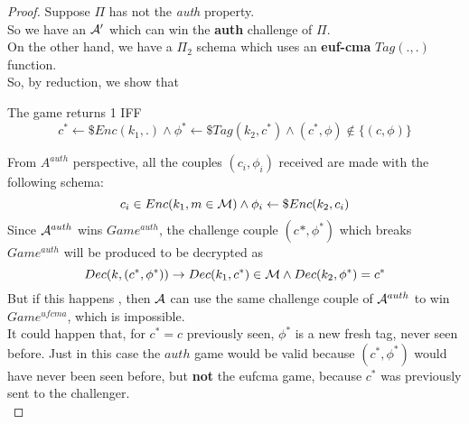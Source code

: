 \begin{proof}
    Suppose $\Pi$ has not the \textit{auth}  property.\\ 
    So we have an $\mathcal{A}'$ which can win the \textbf{auth} challenge of $\Pi$.\\
    On the other hand, we have a $\Pi_{2}$ schema which uses an \textbf{euf-cma}
    $Tag(.,.)$ function.\\
    So, by reduction, we show that 
    

\begin{figure}[h!]
   \centering
   \sdinit{}
\end{figure}
The game returns 1 IFF
\[
    c^{*} \leftarrow\$ Enc(k_{1}, . ) \wedge \phi^{*} \leftarrow\$ Tag(k_{2}, c^{*}) \wedge (c^{*}, \phi) \not\in \{ (c, \phi ) \} 
\]

From $A^{auth}$ perspective, all the couples $(c_{i}, \phi_{i})$ received are
made with the following schema:
\[
    c_{i} \in Enc(k_{1}, m \in \mathcal{M}) \wedge \phi_{i}\leftarrow\$ Enc(k_{2}, c_{i})
\]
Since $\mathcal{A}^{auth}$ wins $Game^{auth}$, the challenge couple $(c^{}{*}, \phi^{*})$
which breaks $Game^{auth}$ will be produced to be decrypted as
\[
    Dec(k, (c^{*}, \phi^{*})) \rightarrow Dec(k_{1}, c^{*}) \in \mathcal{M} \wedge
    Dec(k_{2}, \phi^{*})=c^{*}
\]
But if this happens , then $\mathcal{A}$ can use the same challenge couple of $\mathcal{A}^{auth}$
to win $Game^{ufcma}$, which is impossible.\\

It could happen that, for $c^{*}=c$ previously seen, $\phi^{*}$ is a new
fresh tag, never seen before.
Just in this case the $auth$ game would be valid because $(c^{*}, \phi^{*})$ would
have never been seen before, but \textbf{not } the eufcma game, because $c^{*}$
was previously sent to the challenger.\\
\end{proof}
    

